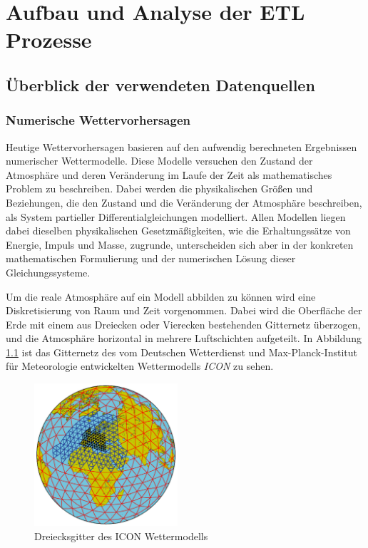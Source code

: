 
\chapter{Aufbau und Analyse der ETL Prozesse}

\section{Überblick der verwendeten Datenquellen}

\subsection{Numerische Wettervorhersagen}

Heutige Wettervorhersagen basieren auf den aufwendig berechneten
Ergebnissen numerischer Wettermodelle. Diese Modelle versuchen den
Zustand der Atmosphäre und deren Veränderung im Laufe der Zeit als
mathematisches Problem zu beschreiben. Dabei werden die physikalischen
Größen und Beziehungen, die den Zustand und die Veränderung der
Atmosphäre beschreiben, als System partieller Differentialgleichungen
modelliert. Allen Modellen liegen dabei dieselben physikalischen
Gesetzmäßigkeiten, wie die Erhaltungssätze von Energie, Impuls und
Masse, zugrunde, unterscheiden sich aber in der konkreten
mathematischen Formulierung und der numerischen Lösung dieser
Gleichungssysteme.

Um die reale Atmosphäre auf ein Modell abbilden zu können wird eine
Diskretisierung von Raum und Zeit vorgenommen. Dabei wird die
Oberfläche der Erde mit einem aus Dreiecken oder Vierecken bestehenden
Gitternetz überzogen, und die Atmosphäre horizontal in mehrere
Luftschichten aufgeteilt. In Abbildung \ref{gitternetz} ist das
Gitternetz des vom Deutschen Wetterdienst und Max-Planck-Institut für
Meteorologie entwickelten Wettermodells \textit{ICON}
 zu sehen.

\begin{figure}[h]
  \begin{center}
    \includegraphics[height=200px]{bilder/gitternetz}
    \caption{Dreiecksgitter des ICON Wettermodells}
    \label{gitternetz}
  \end{center}
\end{figure}

